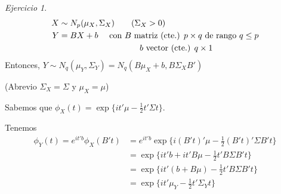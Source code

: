 \documentclass[12pt,spanish]{article}
\theoremstyle{definition}
\theoremstyle{remark}
\newtheorem{exercise}{Ejercicio}
\begin{document}
\newpage

\begin{exercise}
  \begin{align*}
    X&\sim N_p(\mu_X,\Sigma_X)\qquad (\Sigma_X>0) \\
    Y&=B X+b\quad \text{ con $B$ matriz (cte.) $p\times q$ de rango $q\leq p$} \\
     &\hspace{34mm}\text{$b$ vector (cte.) $q\times 1$}
  \end{align*}
  Entonces, $Y\sim N_q(\mu_Y,\Sigma_Y)=N_q(B\mu_X+b,B\Sigma_X B')$

  (Abrevio $\Sigma_X=\Sigma$ y $\mu_X=\mu$)

  Sabemos que $\phi_X(t)=\exp\Big\{it'\mu-\frac{1}{2}t'\Sigma t\Big\}$.

  Tenemos
  \begin{align*}
    \phi_Y(t)=e^{it'b}\phi_X(B't)&=e^{it'b}\exp\Big\{i(B't)'\mu-\frac{1}{2}(B't)'\Sigma B't\Big\} \\
                                 &=\exp\Big\{it'b+it'B\mu-\frac{1}{2}t'B\Sigma B't\Big\} \\
                                 &=\exp\Big\{it'(b+B\mu)-\frac{1}{2}t'B\Sigma B't\Big\} \\
                                 &=\exp\Big\{it'\mu_Y-\frac{1}{2}t'\Sigma_Y t\Big\}
  \end{align*}
  
\end{exercise}
\end{document}
